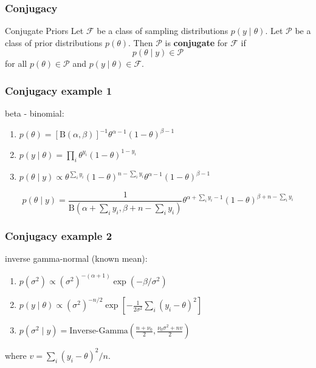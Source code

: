 \documentclass{beamer}
\begin{document}


\begin{frame}[fragile]
\frametitle{Conjugacy}

\begin{block}{Conjugate Priors}
Let $\mathcal{F}$ be a class of sampling distributions $p(y \mid \theta)$. Let $\mathcal{P}$ be a class of prior distributions $p(\theta)$. Then $\mathcal{P}$ is {\bf conjugate} for $\mathcal{F}$ if 
\[
p(\theta \mid y) \in \mathcal{P}
\]
for all $p(\theta) \in \mathcal{P}$ and $p(y \mid \theta) \in \mathcal{F}$.
\end{block}

\end{frame}


\begin{frame}[fragile]
\frametitle{Conjugacy example 1}

beta - binomial:
\begin{enumerate}
\item $p(\theta) = [\text{B}(\alpha,\beta)]^{-1} \theta^{\alpha-1}(1-\theta)^{\beta-1}$
\item $p(y \mid \theta) = \prod_i \theta^{y_i}(1-\theta)^{1-y_i} $
\item $p(\theta \mid y) \propto \theta^{\sum_i y_i}(1-\theta)^{n-\sum_i y_i}\theta^{\alpha-1}(1-\theta)^{\beta-1}$
\end{enumerate}


\[
p(\theta \mid y) = \frac{1}{\text{B}(\alpha + \sum_i y_i, \beta + n - \sum_i y_i)} \theta^{\alpha + \sum_i y_i - 1}(1-\theta)^{\beta + n-\sum_i y_i}
\]

\end{frame}




\begin{frame}[fragile]
\frametitle{Conjugacy example 2}


inverse gamma-normal (known mean):
\begin{enumerate}
\item $p(\sigma^2 ) \propto (\sigma^2)^{-(\alpha+1)} \exp\left( -\beta / \sigma^2 \right)$
\item $p(y \mid \theta) \propto (\sigma^2)^{-n/2} \exp\left[-\frac{1}{2 \sigma^2} \sum_i \left(y_i - \theta \right)^2 \right] $
\item $p(\sigma^2 \mid y) = \text{Inverse-Gamma}\left(\frac{n + \nu_0}{2}, \frac{ \nu_0 \sigma^2 + n v }{2} \right)$
\end{enumerate}
where $v = \sum_i(y_i - \theta)^2 / n$.

\end{frame}
\end{document}
